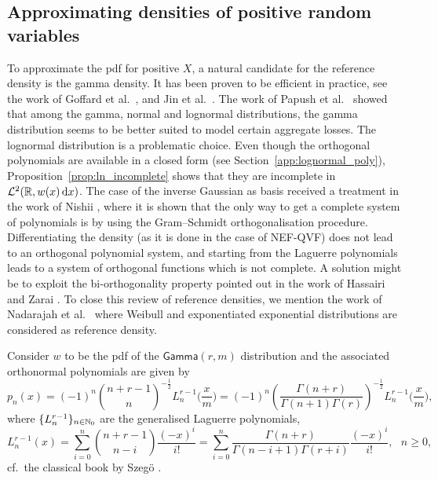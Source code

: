 \subsection{Approximating densities of positive random variables} \label{ssec:PolynomialApproxPositive}

To approximate the pdf for positive $X$, a natural candidate for the reference density is the gamma density. It has been proven to be efficient in practice, see the work of Goffard et al.\ \cite{GoLoPo15,GoLoPo16}, and Jin et al.\ \cite{JiPrRe16}. The work of Papush et al.\ \cite{PaPaPo01} showed that among the gamma, normal and lognormal distributions, the gamma distribution seems to be better suited to model certain aggregate losses. The lognormal distribution is a problematic choice. Even though the orthogonal polynomials are available in a closed form (see Section~\ref{app:lognormal_poly}), Proposition~\ref{prop:ln_incomplete} shows that they are incomplete in $\mathcal{L}^2(\mathbb{R}, w(x) \mathop{}\!\mathrm{d} x)$. The case of the inverse Gaussian as basis received a treatment in the work of Nishii \cite{Ni96}, where it is shown that the only way to get a complete system of polynomials is by using the Gram--Schmidt orthogonalisation procedure. Differentiating the density (as it is done in the case of NEF-QVF) does not lead to an orthogonal polynomial system, and starting from the Laguerre polynomials leads to a system of orthogonal functions which is not complete. A solution might be to exploit the bi-orthogonality property pointed out in the work of Hassairi and Zarai \cite{HaZa04}. To close this review of reference densities, we mention the work of Nadarajah et al.\ \cite{NaChJi16} where Weibull and exponentiated exponential distributions are considered as reference density.

Consider $w$ to be the pdf of the $\mathsf{Gamma}(r,m)$ distribution
and the associated orthonormal polynomials are given by
\begin{equation*}\label{eq:GeneralizedLaguerrePolynomials}
p_{n}(x)
=(-1)^{n} \binom{n + r - 1}{n}^{-\frac12} L_{n}^{r-1}\big(\frac{x}{m}\big)
=(-1)^{n} \left( \frac{\Gamma(n+r)}{\Gamma(n+1)\Gamma(r)} \right)^{-\frac12} L_{n}^{r-1}\big(\frac{x}{m}\big),
\end{equation*}
where $\{L_{n}^{r-1}\}_{n\in\mathbb{N}_0}$ are the generalised Laguerre polynomials,
\begin{equation*}\label{eq:GeneralizedLaguerrePolynomialsExpression}
L_{n}^{r-1}(x)
=\sum_{i=0}^{n} \binom{n + r - 1}{n - i} \frac{(-x)^i}{i!}
=\sum_{i=0}^{n} \frac{\Gamma(n+r)}{\Gamma(n-i+1)\Gamma(r+i)}\frac{(-x)^i}{i!}, \text{ }n\geq 0,
\end{equation*}
cf.\ the classical book by Szeg{\"o} \cite{Szegoe1939}.

